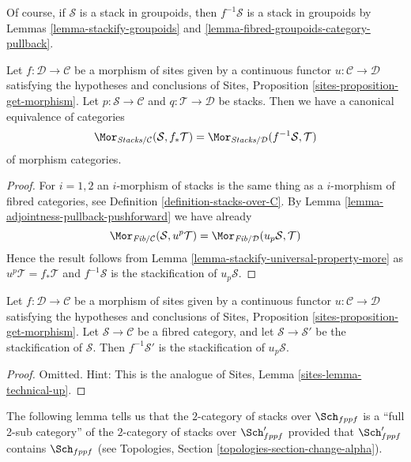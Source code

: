 \noindent
Of course, if $\mathcal{S}$ is a stack in groupoids, then $f^{-1}\mathcal{S}$
is a stack in groupoids by
Lemmas \ref{lemma-stackify-groupoids} and
\ref{lemma-fibred-groupoids-category-pullback}.

\begin{lemma}
\label{lemma-adjointness-pullback-pushforward-stacks}
Let $f : \mathcal{D} \to \mathcal{C}$ be a morphism of sites
given by a continuous functor $u : \mathcal{C} \to \mathcal{D}$
satisfying the hypotheses and conclusions of
Sites, Proposition \ref{sites-proposition-get-morphism}.
Let $p : \mathcal{S} \to \mathcal{C}$ and
$q : \mathcal{T} \to \mathcal{D}$ be stacks.
Then we have a canonical equivalence of categories
$$
\Mor_{\textit{Stacks}/\mathcal{C}}(\mathcal{S}, f_*\mathcal{T})
=
\Mor_{\textit{Stacks}/\mathcal{D}}(f^{-1}\mathcal{S}, \mathcal{T})
$$
of morphism categories.
\end{lemma}

\begin{proof}
For $i = 1, 2$ an $i$-morphism of stacks is the same thing as a
$i$-morphism of fibred categories, see
Definition \ref{definition-stacks-over-C}.
By
Lemma \ref{lemma-adjointness-pullback-pushforward}
we have already
$$
\Mor_{\textit{Fib}/\mathcal{C}}(\mathcal{S}, u^p\mathcal{T})
=
\Mor_{\textit{Fib}/\mathcal{D}}(u_p\mathcal{S}, \mathcal{T})
$$
Hence the result follows from
Lemma \ref{lemma-stackify-universal-property-more}
as $u^p\mathcal{T} = f_*\mathcal{T}$ and $f^{-1}\mathcal{S}$ is the
stackification of $u_p\mathcal{S}$.
\end{proof}

\begin{lemma}
\label{lemma-technical-up}
Let $f : \mathcal{D} \to \mathcal{C}$ be a morphism of sites
given by a continuous functor $u : \mathcal{C} \to \mathcal{D}$
satisfying the hypotheses and conclusions of
Sites, Proposition \ref{sites-proposition-get-morphism}.
Let $\mathcal{S} \to \mathcal{C}$ be a fibred category, and
let $\mathcal{S} \to \mathcal{S}'$ be the stackification of $\mathcal{S}$.
Then $f^{-1}\mathcal{S}'$ is the stackification of
$u_p\mathcal{S}$.
\end{lemma}

\begin{proof}
Omitted. Hint:
This is the analogue of Sites, Lemma \ref{sites-lemma-technical-up}.
\end{proof}

\noindent
The following lemma tells us that the $2$-category of stacks
over $\Sch_{fppf}$ is a ``full 2-sub category'' of the
$2$-category of stacks over $\Sch'_{fppf}$ provided that
$\Sch'_{fppf}$ contains $\Sch_{fppf}$ (see
Topologies, Section \ref{topologies-section-change-alpha}).

